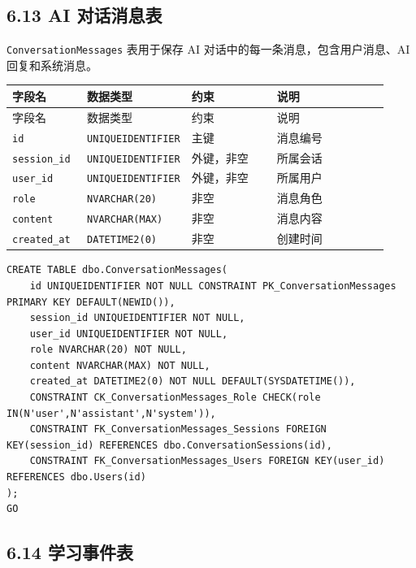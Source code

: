 \documentclass[10pt,a4paper,fontset=none]{ctexart}
\begin{document}
\subsection*{6.13 AI 对话消息表}

\texttt{ConversationMessages} 表用于保存 AI 对话中的每一条消息，包含用户消息、AI 回复和系统消息。\par

\begingroup\scriptsize
\renewcommand{\arraystretch}{1.18}
\setlength{\LTleft}{0pt}
\setlength{\LTright}{0pt}
\begin{longtable}{>{\raggedright\arraybackslash}p{0.20\linewidth}>{\raggedright\arraybackslash}p{0.16\linewidth}>{\raggedright\arraybackslash}p{0.24\linewidth}>{\raggedright\arraybackslash}p{0.32\linewidth}}
\toprule
字段名 & 数据类型 & 约束 & 说明 \\
\midrule
\endfirsthead
\toprule
字段名 & 数据类型 & 约束 & 说明 \\
\midrule
\endhead
\texttt{id} & \texttt{UNIQUEIDENTIFIER} & 主键 & 消息编号 \\
\texttt{session\_id} & \texttt{UNIQUEIDENTIFIER} & 外键，非空 & 所属会话 \\
\texttt{user\_id} & \texttt{UNIQUEIDENTIFIER} & 外键，非空 & 所属用户 \\
\texttt{role} & \texttt{NVARCHAR(20)} & 非空 & 消息角色 \\
\texttt{content} & \texttt{NVARCHAR(MAX)} & 非空 & 消息内容 \\
\texttt{created\_at} & \texttt{DATETIME2(0)} & 非空 & 创建时间 \\
\bottomrule
\end{longtable}
\endgroup


\begin{Verbatim}[fontsize=\scriptsize,frame=single]
CREATE TABLE dbo.ConversationMessages(
    id UNIQUEIDENTIFIER NOT NULL CONSTRAINT PK_ConversationMessages PRIMARY KEY DEFAULT(NEWID()),
    session_id UNIQUEIDENTIFIER NOT NULL,
    user_id UNIQUEIDENTIFIER NOT NULL,
    role NVARCHAR(20) NOT NULL,
    content NVARCHAR(MAX) NOT NULL,
    created_at DATETIME2(0) NOT NULL DEFAULT(SYSDATETIME()),
    CONSTRAINT CK_ConversationMessages_Role CHECK(role IN(N'user',N'assistant',N'system')),
    CONSTRAINT FK_ConversationMessages_Sessions FOREIGN KEY(session_id) REFERENCES dbo.ConversationSessions(id),
    CONSTRAINT FK_ConversationMessages_Users FOREIGN KEY(user_id) REFERENCES dbo.Users(id)
);
GO
\end{Verbatim}

\subsection*{6.14 学习事件表}
\end{document}

